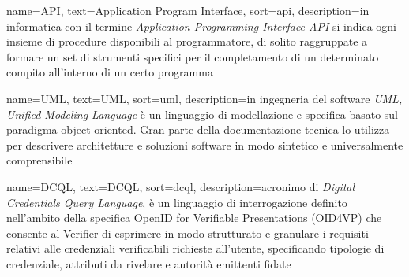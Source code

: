 \renewcommand{\acronymname}{Acronimi e abbreviazioni}


{
    name=API,
    text=Application Program Interface,
    sort=api,
    description={in informatica con il termine \emph{Application Programming Interface API} si indica ogni insieme di procedure disponibili al programmatore, di solito raggruppate a formare un set di strumenti specifici per il completamento di un determinato compito all'interno di un certo programma}
}

{
    name=UML,
    text=UML,
    sort=uml,
    description={in ingegneria del software \emph{UML, Unified Modeling Language} è un linguaggio di modellazione e specifica basato sul paradigma object-oriented. Gran parte della documentazione tecnica lo utilizza per descrivere architetture e soluzioni software in modo sintetico e universalmente comprensibile}
}

{
    name=DCQL,
    text=DCQL,
    sort=dcql,
    description={acronimo di \emph{Digital Credentials Query Language}, è un linguaggio di interrogazione definito nell'ambito della specifica OpenID for Verifiable Presentations (OID4VP) che consente al Verifier di esprimere in modo strutturato e granulare i requisiti relativi alle credenziali verificabili richieste all'utente, specificando tipologie di credenziale, attributi da rivelare e autorità emittenti fidate}
}

